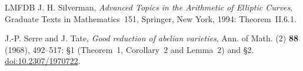 \documentclass[11pt]{article}
\begin{document}
\begin{thebibliography}{LMFDB}
J. H. Silverman, \emph{Advanced Topics in the Arithmetic of Elliptic Curves}, Graduate Texts in Mathematics~151,
Springer, New York, 1994: Theorem~II.6.1.

J.-P. Serre and J. Tate, \emph{Good reduction of abelian varieties}, Ann. of Math. (2) \textbf{88} (1968),
492--517: \S1 (Theorem~1, Corollary~2 and Lemma~2) and \S2.
\href{https://doi.org/10.2307/1970722}{doi:10.2307/1970722}.

\end{thebibliography}
\end{document}
